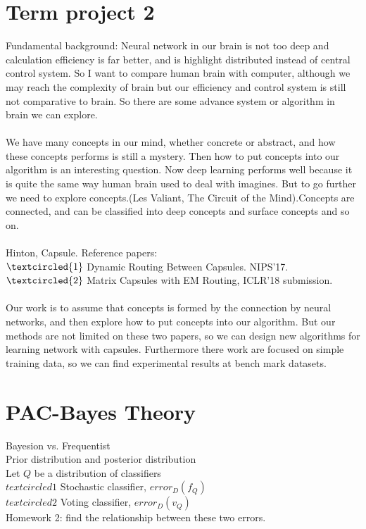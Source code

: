\documentclass{article}
\begin{document}
\section{Term project 2}
Fundamental background: Neural network in our brain is not too deep and calculation efficiency is far better, and is highlight distributed instead of central control system. So I want to compare human brain with computer, although we may reach the complexity of brain but our efficiency and control system is still not comparative to brain. So there are some advance system or algorithm in brain we can explore.
\\\\We have many concepts in our mind, whether concrete or abstract, and how these concepts performs is still a mystery. Then how to put concepts into our algorithm is an interesting question. Now deep learning performs well because it is quite the same way human brain used to deal with imagines. But to go further we need to explore concepts.(Les Valiant, The Circuit of the Mind).Concepts are connected, and can be classified into deep concepts and surface concepts and so on.
\\\\Hinton, Capsule. Reference papers:
\\$\textcircled{1}$ Dynamic Routing Between Capsules. NIPS'17.
\\$\textcircled{2}$ Matrix Capsules with EM Routing, ICLR'18 submission.
\\\\Our work is to assume that concepts is formed by the connection by neural networks, and then explore how to put concepts into our algorithm. But our methods are not limited on these two papers, so we can design new algorithms for learning network with capsules. Furthermore there work are focused on simple training data, so we can find experimental results at bench mark datasets.
\section{PAC-Bayes Theory}
Bayesion vs. Frequentist
\\Prior distribution and posterior distribution
\\Let $Q$ be a distribution of classifiers
\\$textcircled{1}$ Stochastic classifier, $error_D(f_Q)$
\\$textcircled{2}$ Voting classifier, $error_D(v_Q)$
\\Homework 2: find the relationship between these two errors.
\end{document}
